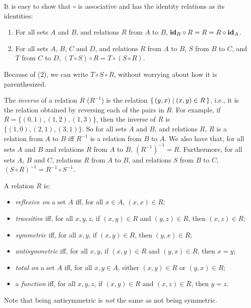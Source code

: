 It is easy to show that $\circ$ is associative
%
%
%
%
and has the identity relations as its identities:
\begin{enumerate}[\quad(1)]
\item For all sets $A$ and $B$, and relations $R$ from $A$ to $B$,
$\mathbf{id}_B\circ R = R = R\circ\mathbf{id}_A$.

\item For all sets $A$, $B$, $C$ and $D$, and relations
$R$ from $A$ to $B$, $S$ from $B$ to $C$, and $T$ from $C$ to $D$,
$(T\circ S)\circ R = T\circ (S\circ R)$.
\end{enumerate}
Because of (2), we can write $T\circ S\circ R$, without worrying about
how it is parenthesized.

The \emph{inverse}
%
of a relation $R$ ($R^{-1}$) is the relation
$\{ \, (y, x) \mid (x, y)\in R \, \}$, i.e., it is the relation obtained by
reversing each of the pairs in $R$.  For example, if
$R=\{(0, 1), (1, 2), (1, 3)\}$, then the inverse of $R$ is
$\{(1, 0), (2, 1), (3, 1)\}$.  So for all sets $A$ and $B$, and
relations $R$, $R$ is a relation from $A$ to $B$ iff $R^{-1}$ is a
relation from $B$ to $A$. We also have that, for all sets $A$ and $B$
and relations $R$ from $A$ to $B$, $(R^{-1})^{-1} = R$. Furthermore,
for all sets $A$, $B$ and $C$, relations $R$ from $A$ to $B$, and
relations $S$ from $B$ to $C$, $(S\circ R)^{-1} = R^{-1}\circ S^{-1}$.

A relation $R$ is:
\begin{itemize}
\item \emph{reflexive on}
%
%
a set $A$ iff, for all $x\in A$, $(x,x)\in R$;

\item \emph{transitive}
%
%
iff, for all $x,y,z$, if $(x,y)\in R$ and
$(y,z)\in R$, then $(x, z)\in R$;

\item \emph{symmetric}
%
%
iff, for all $x,y$, if $(x,y)\in R$, then $(y, x)\in R$;

\item \emph{antisymmetric}
%
%
iff, for all $x,y$, if $(x,y)\in R$ and $(y,x)\in R$, then $x=y$;

\item \emph{total on}
%
%
a set $A$ iff, for all $x,y\in A$, either $(x,y)\in R$ or $(y,x)\in R$;

\item a \emph{function}
%
%
iff, for all $x,y,z$, if $(x,y)\in R$ and $(x, z)\in R$, then $y=z$.
\end{itemize}
Note that being antisymmetric is \emph{not} the same as not being symmetric.

